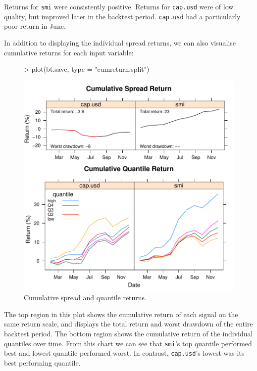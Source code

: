 \documentclass[a4paper]{report}
\begin{document}
\begin{article}
Returns for \texttt{smi} were consistently positive.  Returns for
\texttt{cap.usd} were of low quality, but improved later in the
backtest period.  \texttt{cap.usd} had a particularly poor return in
June.

In addition to displaying the individual spread returns, we can also
visualise cumulative returns for each input variable:

\begin{figure}
\centering
\vspace*{.1in}
\begin{Schunk}
\begin{Sinput}
> plot(bt.save, type = "cumreturn.split")
\end{Sinput}
\end{Schunk}
\includegraphics{backtest-021}
\caption{\label{figure:fanplot}
Cumulative spread and quantile returns.}
\end{figure}

The top region in this plot shows the cumulative return of each signal
on the same return scale, and displays the total return and worst
drawdown of the entire backtest period.  The bottom region shows the
cumulative return of the individual quantiles over time.  From this
chart we can see that \texttt{smi}'s top quantile performed best and
lowest quantile performed worst.  In contrast, \texttt{cap.usd}'s
lowest was its best performing quantile.


\end{article}
\end{document}
